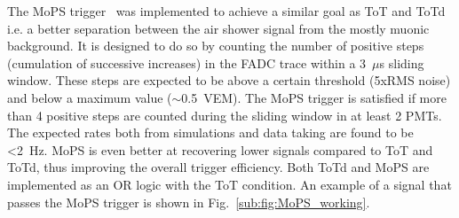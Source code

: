 The MoPS trigger~\cite{gap_note_2011} was implemented to achieve a similar goal as ToT and ToTd i.e. a better separation between the air shower signal from the mostly muonic background. It is designed to do so by counting the number of positive steps (cumulation of successive increases) in the \gls{FADC} trace within a 3 $\mu$s sliding window. These steps are expected to be above a certain threshold (5xRMS noise) and below a maximum value ($\sim$0.5 VEM). The MoPS trigger is satisfied if more than 4 positive steps are counted during the sliding window in at least 2 PMTs. The expected rates both from simulations and data taking are found to be <2 Hz. MoPS is even better at recovering lower signals compared to ToT and ToTd, thus improving the overall trigger efficiency. Both ToTd and MoPS are implemented as an OR logic with the ToT condition. An example of a signal that passes the MoPS trigger is shown in Fig.~\ref{sub:fig:MoPS_working}.



